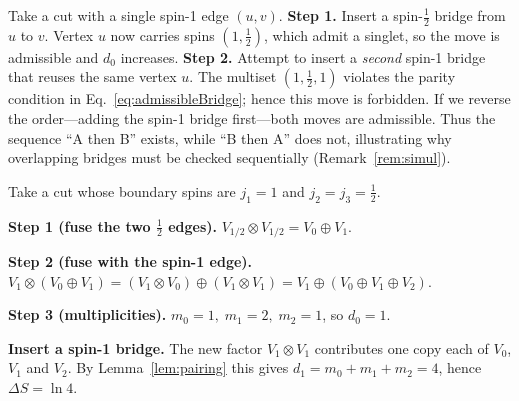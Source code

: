 \documentclass[11pt]{article}
\begin{document}
\begin{example}\label{ex:overlap}
Take a cut with a single spin-1 edge $(u,v)$.
\textbf{Step 1.} Insert a spin-$\tfrac12$ bridge from $u$ to $v$.
Vertex $u$ now carries spins $(1,\tfrac12)$, which admit a singlet, so the move is admissible and $d_0$ increases.
\textbf{Step 2.} Attempt to insert a \emph{second} spin-1 bridge that reuses the same vertex $u$.
The multiset $(1,\tfrac12,1)$ violates the parity condition in Eq.~\eqref{eq:admissibleBridge}; hence this move is forbidden.
If we reverse the order—adding the spin-1 bridge first—both moves are admissible. 
Thus the sequence “A then B” exists, while “B then A” does not, illustrating why overlapping bridges must be checked sequentially (Remark~\ref{rem:simul}).

\end{example}

\begin{example}\label{ex:mixed}
Take a cut whose boundary spins are \(j_1=1\) and \(j_2=j_3=\tfrac12\).

\textbf{Step 1 (fuse the two \(\tfrac12\) edges).} \(V_{1/2}\otimes V_{1/2}=V_0\oplus V_1\).

\textbf{Step 2 (fuse with the spin-1 edge).} \(V_1\otimes(V_0\oplus V_1)=(V_1\otimes V_0)\oplus(V_1\otimes V_1)=V_1\oplus(V_0\oplus V_1\oplus V_2)\).

\textbf{Step 3 (multiplicities).} \(m_0=1,\; m_1=2,\; m_2=1\), so \(d_0=1\).

\textbf{Insert a spin-1 bridge.} 
The new factor \(V_1\otimes V_1\) contributes one copy each of
\(V_0\), \(V_1\) and \(V_2\).
By Lemma~\ref{lem:pairing} this gives
\(d_1=m_0+m_1+m_2=4\), hence \(\Delta S=\ln 4\).


\end{example}
\end{document}
